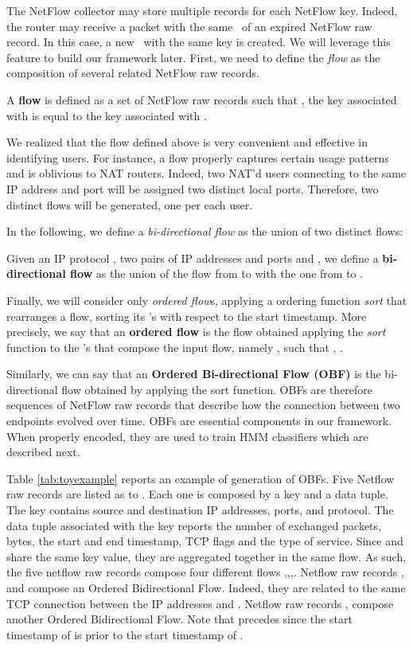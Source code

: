 \documentclass[10pt,conference,compsocconf,letterpaper]{IEEEtran}
\begin{document}
The NetFlow collector may store multiple records for each 
NetFlow key. Indeed, the router may receive a packet with 
the same \fkey\  of an expired NetFlow raw record. In this case, a new 
 \nfr\ with the same key is created.
We will leverage this feature to build our framework later. First, we need
to define the  \emph{flow} as the composition of several related NetFlow 
raw records.
\begin{definition}
\label{def:flow}
  A \textbf{flow}  is defined as a set of NetFlow raw records
   such that , the key associated with  is equal to the key associated with .
\end{definition}
We realized that the flow defined above is very convenient and effective in identifying 
users. For instance, a flow properly captures certain usage patterns and is 
oblivious to NAT routers. Indeed, two NAT'd users connecting to the
same IP address and port will be assigned two distinct local ports. Therefore, 
two distinct flows will be generated, one per each user.  
 


In the following, we define a \emph{bi-directional flow} as
the union of two distinct flows:
\begin{definition}
  Given an IP protocol , two pairs of IP addresses
  and ports  and
  , we define a \textbf{bi-directional
    flow} as the union of the flow from
   to 
  with the one from  to
  .
\end{definition}
Finally, we will consider only \emph{ordered flow}s, applying a
ordering function \textit{sort} that rearranges a flow, sorting its
\nfr's with respect to the start timestamp. More precisely, we
say that an \textbf{ordered flow} is the flow obtained applying the
\textit{sort} function to the \nfr's that compose the input flow,
namely , such that ,
.

Similarly, we can say that an \textbf{Ordered Bi-directional Flow
  (OBF)} is the bi-directional flow obtained by applying the sort function.
OBFs are therefore sequences of NetFlow raw records 
that describe how the connection between two endpoints evolved over time.
OBFs are essential components in our framework. When properly encoded,
they are used to train HMM classifiers which are described next.

Table \ref{tab:toyexample} reports an example of generation of OBFs. 
Five Netflow raw records are listed as  to . 
Each one is composed
by a key and a data tuple. The key contains source and destination IP addresses, ports, and protocol. 
The data tuple associated with the key reports the number of exchanged packets, bytes, the start and end timestamp, TCP flags and the type of service. Since  and  share the same key value, they are aggregated together in the same flow. As such, the five netflow raw records compose four different flows ,,,.
Netflow raw records ,  and  compose an Ordered Bidirectional Flow. 
Indeed, they are related to the same TCP connection between the IP addresses  and . 
Netflow raw records ,  compose another Ordered Bidirectional Flow. Note that  precedes  since the start timestamp of  is prior to the start timestamp of .
\end{document}
